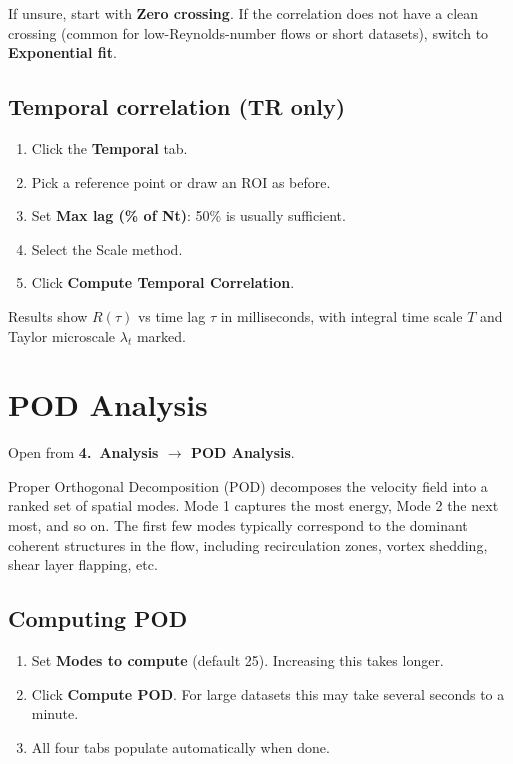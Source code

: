 \documentclass[11pt, a4paper]{report}
\newcommand{\uipth}[1]{\textbf{\textcolor{upblue}{#1}}}
\begin{document}
\begin{tipbox}
If unsure, start with \textbf{Zero crossing}. If the correlation does not have a clean crossing (common for low-Reynolds-number flows or short datasets), switch to \textbf{Exponential fit}.
\end{tipbox}

\section{Temporal correlation (TR only)}

\begin{stepbox}
\begin{enumerate}[leftmargin=1.5em, topsep=2pt]
  \item Click the \uipth{Temporal} tab.
  \item Pick a reference point or draw an ROI as before.
  \item Set \uipth{Max lag (\% of Nt)}: 50\% is usually sufficient.
  \item Select the Scale method.
  \item Click \uipth{Compute Temporal Correlation}.
\end{enumerate}
\end{stepbox}

Results show $R(\tau)$ vs time lag $\tau$ in milliseconds, with integral time scale $T$ and Taylor microscale $\lambda_t$ marked.

\chapter{POD Analysis}
\label{ch:pod}

Open from \uipth{4.\ Analysis $\to$ POD Analysis}.

Proper Orthogonal Decomposition (POD) decomposes the velocity field into a ranked set of spatial modes. Mode 1 captures the most energy, Mode 2 the next most, and so on. The first few modes typically correspond to the dominant coherent structures in the flow, including recirculation zones, vortex shedding, shear layer flapping, etc.

\section{Computing POD}

\begin{stepbox}
\begin{enumerate}[leftmargin=1.5em, topsep=2pt]
  \item Set \uipth{Modes to compute} (default 25). Increasing this takes longer.
  \item Click \uipth{Compute POD}. For large datasets this may take several seconds to a minute.
  \item All four tabs populate automatically when done.
\end{enumerate}
\end{stepbox}
\end{document}
